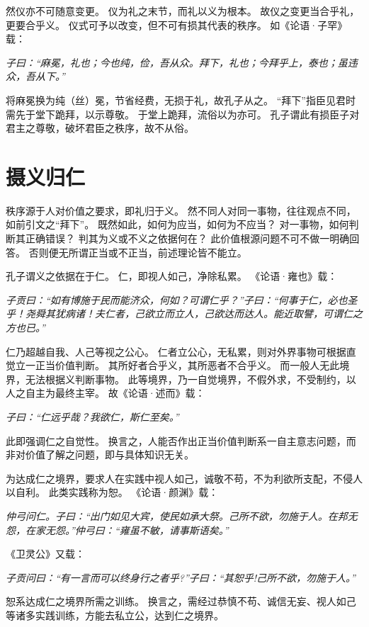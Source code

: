 \documentclass[11pt]{article}
\begin{document}
然仪亦不可随意变更。
仪为礼之末节，而礼以义为根本。
故仪之变更当合乎礼，更要合乎义。
仪式可予以改变，但不可有损其代表的秩序。
如《论语·子罕》载：

\textit{子曰：“麻冕，礼也；今也纯，俭，吾从众。拜下，礼也；今拜乎上，泰也；虽违众，吾从下。”}

将麻冕换为纯（丝）冕，节省经费，无损于礼，故孔子从之。
“拜下”指臣见君时需先于堂下跪拜，以示尊敬。
于堂上跪拜，流俗以为亦可。
孔子谓此有损臣子对君主之尊敬，破坏君臣之秩序，故不从俗。

\section{摄义归仁}
秩序源于人对价值之要求，即礼归于义。
然不同人对同一事物，往往观点不同，如前引文之“拜下”。
既然如此，如何为应当，如何为不应当？
对一事物，如何判断其正确错误？
判其为义或不义之依据何在？
此价值根源问题不可不做一明确回答。
否则便无所谓正当或不正当，前述理论皆不能立。

\par

孔子谓义之依据在于仁。
仁，即视人如己，净除私累。
《论语·雍也》载：

\textit{子贡曰：“如有博施于民而能济众，何如？可谓仁乎？”子曰：“何事于仁，必也圣乎！尧舜其犹病诸！夫仁者，己欲立而立人，己欲达而达人。能近取譬，可谓仁之方也已。”}

仁乃超越自我、人己等视之公心。
仁者立公心，无私累，则对外界事物可根据直觉立一正当价值判断。
其所好者合乎义，其所恶者不合乎义。
而一般人无此境界，无法根据义判断事物。
此等境界，乃一自觉境界，不假外求，不受制约，以人之自主为最终主宰。
故《论语·述而》载：

\textit{子曰：“仁远乎哉？我欲仁，斯仁至矣。”}

此即强调仁之自觉性。
换言之，人能否作出正当价值判断系一自主意志问题，而非对价值了解之问题，即与具体知识无关。

\par

为达成仁之境界，要求人在实践中视人如己，诚敬不苟，不为利欲所支配，不侵人以自利。
此类实践称为恕。
《论语·颜渊》载：

\textit{仲弓问仁。子曰：“出门如见大宾，使民如承大祭。己所不欲，勿施于人。在邦无怨，在家无怨。”仲弓曰：“雍虽不敏，请事斯语矣。”}

《卫灵公》又载：

\textit{子贡问曰：“有一言而可以终身行之者乎?”子曰：“其恕乎!己所不欲，勿施于人。”}

恕系达成仁之境界所需之训练。
换言之，需经过恭慎不苟、诚信无妄、视人如己等诸多实践训练，方能去私立公，达到仁之境界。
\end{document}
